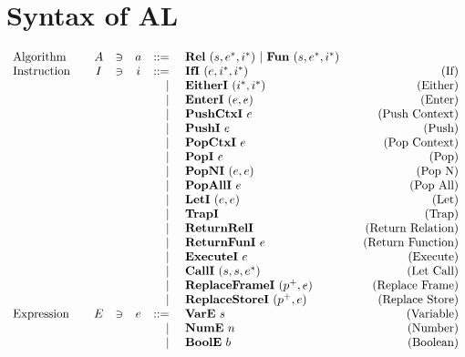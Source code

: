 \section{Syntax of AL}
\label{syntax}

{
\renewcommand{\arraystretch}{0.8835}  %
\begin{align*}
\begin{array}{lcccrlr}
%
  \text{Algorithm}\quad& A &\ni& a &::=& ~ \rel ~ (s, \seq e, \seq i) ~ | ~ \fun ~ (s, \seq e, \seq i) \\
%
  \text{Instruction}\quad& I &\ni& i &::=& ~ \ifi ~ (e, \seq i, \seq i) &\quad\text{(If)} \\
    &&&& | & ~ \eitheri ~ (\seq i, \seq i) &\quad\text{(Either)} \\
    &&&& | & ~ \enteri ~ (e, e) &\quad\text{(Enter)} \\
    &&&& | & ~ \pushctxi ~ e &\quad\text{(Push Context)} \\
    &&&& | & ~ \pushi ~ e &\quad\text{(Push)} \\
    &&&& | & ~ \popctxi ~ e &\quad\text{(Pop Context)} \\
    &&&& | & ~ \popi ~ e &\quad\text{(Pop)} \\
    &&&& | & ~ \popni ~ (e, e) &\quad\text{(Pop N)} \\
    &&&& | & ~ \popalli ~ e &\quad\text{(Pop All)} \\
    &&&& | & ~ \leti ~ (e, e) &\quad\text{(Let)} \\
    &&&& | & ~ \trapi &\quad\text{(Trap)} \\
    &&&& | & ~ \returnreli &\quad\text{(Return Relation)} \\
    &&&& | & ~ \returnfuni ~ e &\quad\text{(Return Function)} \\
    &&&& | & ~ \executei ~ e &\quad\text{(Execute)} \\
    &&&& | & ~ \calli ~ (s, s, \seq{e}) &\quad\text{(Let Call)} \\
    &&&& | & ~ \replaceframei ~ (p^+, e) &\quad\text{(Replace Frame)} \\
    &&&& | & ~ \replacestorei ~ (p^+, e) &\quad\text{(Replace Store)} \\
%
  \text{Expression}\quad& E &\ni& e &::=& ~ \vare ~ s &\quad\text{(Variable)} \\
    &&&& | & ~ \nume ~ n &\quad\text{(Number)} \\
    &&&& | & ~ \boole ~ b &\quad\text{(Boolean)} \\

\end{array}
\end{align*}}
